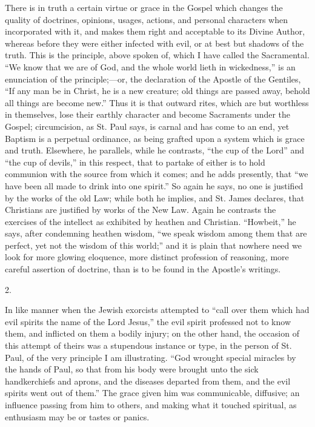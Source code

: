 There is in truth a certain virtue or grace in the
Gospel which changes the quality of doctrines, opinions,
usages, actions, and personal characters when
incorporated with it, and makes them right and acceptable
to its Divine Author, whereas before they were either
infected with evil, or at best but shadows of the truth.
This is the principle, above spoken of, which I have
called the Sacramental. ``We know that we are of God,
and the whole world lieth in wickedness,'' is an
enunciation of the principle;—or, the declaration of
the Apostle of the Gentiles, ``If any man be in
Christ, he is a new creature; old things are passed away,
behold all things are become new.'' Thus it is that
outward rites, which are but worthless in themselves,
lose their earthly character and become Sacraments under
the Gospel; circumcision, as St. Paul says, is carnal and
has come to an end, yet Baptism is a perpetual ordinance,
as being grafted upon a system which is grace and truth.
Elsewhere, he parallels, while he contrasts, ``the
cup of the Lord'' and ``the cup of devils,''
in this respect, that to partake of either is to hold
communion with the source from which it comes; and he
adds presently, that ``we have been all made to drink
into one spirit.'' So again he says, no one is
justified by the works of the old Law; while both he
implies, and St. James declares, that Christians are
justified by works of the New Law. Again he
contrasts the exercises of the intellect as exhibited by
heathen and Christian. ``Howbeit,'' he says,
after condemning heathen wisdom, ``we speak wisdom
among them that are perfect, yet not the wisdom of this
world;'' and it is plain that nowhere need we look
for more glowing eloquence, more distinct profession of
reasoning, more careful assertion of doctrine, than is to be found in the Apostle's writings.

2.

In like manner when the Jewish exorcists attempted to
``call over them which had evil spirits the name of
the Lord Jesus,'' the evil spirit professed not to
know them, and inflicted on them a bodily injury; on the
other hand, the occasion of this attempt of theirs was a
stupendous instance or type, in the person of St. Paul,
of the very principle I am illustrating. ``God
wrought special miracles by the hands of Paul, so that
from his body were brought unto the sick handkerchiefs
and aprons, and the diseases departed from them, and the
evil spirits went out of them.'' The grace given him
was communicable, diffusive; an influence passing from
him to others, and making what it touched spiritual, as
enthusiasm may be or tastes or panics.

